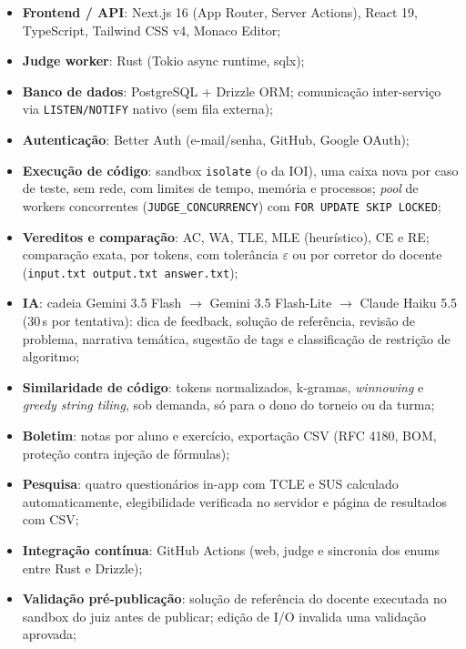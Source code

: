 \documentclass[12pt]{article}
\begin{document}
\begin{itemize}[nosep]
  \item \textbf{Frontend / API}: Next.js 16 (App Router, Server Actions), React
        19, TypeScript, Tailwind CSS v4, Monaco Editor;
  \item \textbf{Judge worker}: Rust (Tokio async runtime, sqlx);
  \item \textbf{Banco de dados}: PostgreSQL + Drizzle ORM; comunicação
        inter-serviço via \texttt{LISTEN/NOTIFY} nativo (sem fila externa);
  \item \textbf{Autenticação}: Better Auth (e-mail/senha, GitHub, Google OAuth);
  \item \textbf{Execução de código}: sandbox \texttt{isolate} (o da IOI), uma
        caixa nova por caso de teste, sem rede, com limites de tempo, memória
        e processos; \emph{pool} de workers concorrentes
        (\texttt{JUDGE\_CONCURRENCY}) com \texttt{FOR UPDATE SKIP LOCKED};
  \item \textbf{Vereditos e comparação}: AC, WA, TLE, MLE (heurístico), CE e
        RE; comparação exata, por tokens, com tolerância $\varepsilon$ ou por
        corretor do docente (\texttt{input.txt output.txt answer.txt});
  \item \textbf{IA}: cadeia Gemini 3.5 Flash $\rightarrow$ Gemini 3.5
        Flash-Lite $\rightarrow$ Claude Haiku 5.5 (30\,s por tentativa):
        dica de feedback, solução de referência, revisão de problema,
        narrativa temática, sugestão de tags e classificação de restrição de
        algoritmo;
  \item \textbf{Similaridade de código}: tokens normalizados, k-gramas,
        \emph{winnowing} e \emph{greedy string tiling}, sob demanda, só para o
        dono do torneio ou da turma;
  \item \textbf{Boletim}: notas por aluno e exercício, exportação CSV (RFC
        4180, BOM, proteção contra injeção de fórmulas);
  \item \textbf{Pesquisa}: quatro questionários in-app com TCLE e SUS
        calculado automaticamente, elegibilidade verificada no servidor e
        página de resultados com CSV;
  \item \textbf{Integração contínua}: GitHub Actions (web, judge e
        sincronia dos enums entre Rust e Drizzle);
  \item \textbf{Validação pré-publicação}: solução de referência do docente
        executada no sandbox do juiz antes de publicar; edição de I/O
        invalida uma validação aprovada;

\end{itemize}
\end{document}
